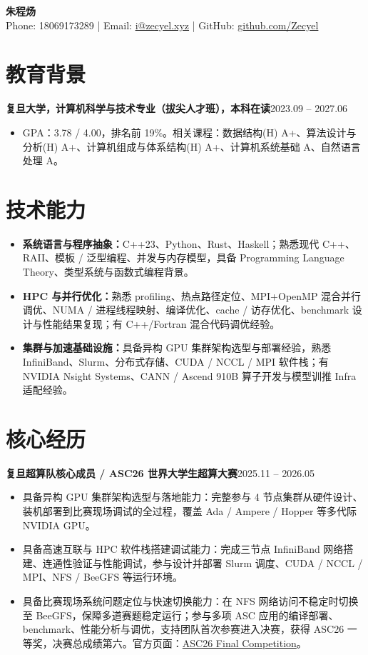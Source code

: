 \documentclass[10pt,a4paper]{ctexart}
\newcommand{\entry}[2]{\textbf{#1}\hfill {#2}}
\newcommand{\link}[2]{\href{#1}{#2}}
\begin{document}
\begin{center}
  {\LARGE \textbf{朱程炀}}\\[3pt]
  Phone: 18069173289 \;|\; Email: \href{mailto:i@zecyel.xyz}{i@zecyel.xyz} \;|\; GitHub: \href{https://github.com/Zecyel}{github.com/Zecyel}
\end{center}

\section*{教育背景}
\entry{复旦大学，计算机科学与技术专业（拔尖人才班），本科在读}{2023.09 -- 2027.06}
\begin{itemize}
  \item GPA：3.78 / 4.00，排名前 19\%。相关课程：数据结构(H) A+、算法设计与分析(H) A+、计算机组成与体系结构(H) A+、计算机系统基础 A、自然语言处理 A。
\end{itemize}

\section*{技术能力}
\begin{itemize}
  \item \textbf{系统语言与程序抽象：}C++23、Python、Rust、Haskell；熟悉现代 C++、RAII、模板 / 泛型编程、并发与内存模型，具备 Programming Language Theory、类型系统与函数式编程背景。
  \item \textbf{HPC 与并行优化：}熟悉 profiling、热点路径定位、MPI+OpenMP 混合并行调优、NUMA / 进程线程映射、编译优化、cache / 访存优化、benchmark 设计与性能结果复现；有 C++/Fortran 混合代码调优经验。
  \item \textbf{集群与加速基础设施：}具备异构 GPU 集群架构选型与部署经验，熟悉 InfiniBand、Slurm、分布式存储、CUDA / NCCL / MPI 软件栈；有 NVIDIA Nsight Systems、CANN / Ascend 910B 算子开发与模型训推 Infra 适配经验。
\end{itemize}

\section*{核心经历}
\entry{复旦超算队核心成员 / ASC26 世界大学生超算大赛}{2025.11 -- 2026.05}
\begin{itemize}
  \item 具备异构 GPU 集群架构选型与落地能力：完整参与 4 节点集群从硬件设计、装机部署到比赛现场调试的全过程，覆盖 Ada / Ampere / Hopper 等多代际 NVIDIA GPU。
  \item 具备高速互联与 HPC 软件栈搭建调试能力：完成三节点 InfiniBand 网络搭建、连通性验证与性能调试，参与设计并部署 Slurm 调度、CUDA / NCCL / MPI、NFS / BeeGFS 等运行环境。
  \item 具备比赛现场系统问题定位与快速切换能力：在 NFS 网络访问不稳定时切换至 BeeGFS，保障多道赛题稳定运行；参与多项 ASC 应用的编译部署、benchmark、性能分析与调优，支持团队首次参赛进入决赛，获得 ASC26 一等奖，决赛总成绩第六。官方页面：\link{https://www.asc-events.net/StudentChallenge/ASC26/final-competition.php}{ASC26 Final Competition}。
\end{itemize}
\end{document}

